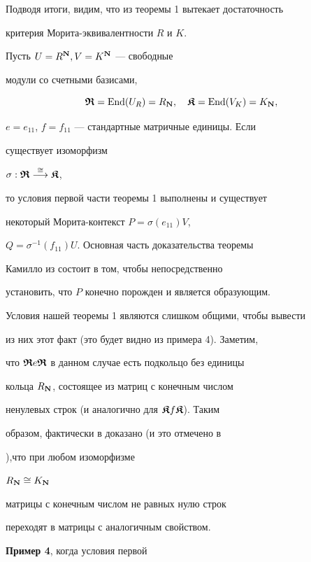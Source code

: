 Подводя итоги, видим, что из теоремы 1 вытекает достаточность


критерия Морита-экви\-валентности $R$ и $K$.





\begin{exam} Пусть $U=R^{\bold N},V=K^{\bold N}$ --- свободные


модули со счетными базисами,


$$


\R=\End(U_R)= R_{\bold N},\quad \K=\End(V_K)=K_{\bold N},


$$


$e=e_{11}$, $f=f_{11}$ --- стандартные матричные единицы. Если


существует изоморфизм


$\sigma: \boldsymbol{\frak R} \overset{\cong}{\longrightarrow}\boldsymbol{\frak K} $,


то условия первой части теоремы 1 выполнены и существует


некоторый Морита-контекст $P=\sigma(e_{11}) V$,


$Q=\sigma^{-1}(f_{11}) U$. Основная часть доказательства теоремы


Камилло из \cite{Cam} состоит в том, чтобы непосредственно


установить, что $P$ конечно порожден и является образующим.


Условия нашей теоремы 1 являются слишком общими, чтобы вывести


из них этот факт (это будет видно из примера 4). Заметим,


что $\boldsymbol{\frak R} e \boldsymbol{\frak R}$ в данном случае есть подкольцо без единицы


кольца $R_{\bold N}$, состоящее из матриц с конечным числом


ненулевых строк (и аналогично для $\boldsymbol{\frak K} f \boldsymbol{\frak K}$). Таким


образом, фактически в \cite{Cam} доказано (и это отмечено в


\cite{Abr}),что при любом изоморфизме


$R_{\bold N} \cong K_{\bold N}$


матрицы с конечным числом не равных нулю строк


переходят в матрицы с аналогичным свойством.


\end{exam}





{\bf Пример 4}, когда условия первой


